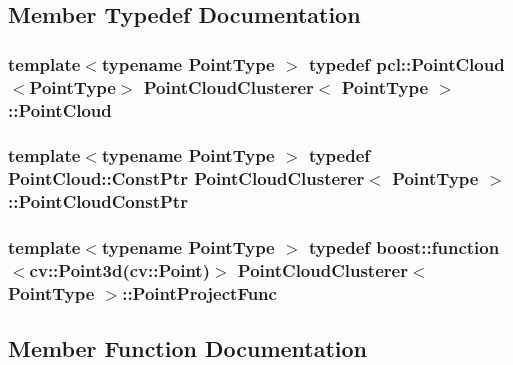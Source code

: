\subsection{Member Typedef Documentation}
\hypertarget{classPointCloudClusterer_aeac82c7494ccf2580112ef55d7e30b39}{}
\subsubsection[{Point\+Cloud}]{\setlength{\rightskip}{0pt plus 5cm}template$<$typename Point\+Type $>$ typedef pcl\+::\+Point\+Cloud$<$Point\+Type$>$ {\bf Point\+Cloud\+Clusterer}$<$ Point\+Type $>$\+::{\bf Point\+Cloud}}\label{classPointCloudClusterer_aeac82c7494ccf2580112ef55d7e30b39}
\hypertarget{classPointCloudClusterer_a042579611b15a7ae275603b624df3968}{}
\subsubsection[{Point\+Cloud\+Const\+Ptr}]{\setlength{\rightskip}{0pt plus 5cm}template$<$typename Point\+Type $>$ typedef Point\+Cloud\+::\+Const\+Ptr {\bf Point\+Cloud\+Clusterer}$<$ Point\+Type $>$\+::{\bf Point\+Cloud\+Const\+Ptr}}\label{classPointCloudClusterer_a042579611b15a7ae275603b624df3968}
\hypertarget{classPointCloudClusterer_adc13c5f02a2a888f33eedbc33188f202}{}
\subsubsection[{Point\+Project\+Func}]{\setlength{\rightskip}{0pt plus 5cm}template$<$typename Point\+Type $>$ typedef boost\+::function$<$cv\+::\+Point3d(cv\+::\+Point)$>$ {\bf Point\+Cloud\+Clusterer}$<$ Point\+Type $>$\+::{\bf Point\+Project\+Func}}\label{classPointCloudClusterer_adc13c5f02a2a888f33eedbc33188f202}


\subsection{Member Function Documentation}
\hypertarget{classPointCloudClusterer_a8c2ad76e5ddbea4277a03bd105f2ec9e}{}

